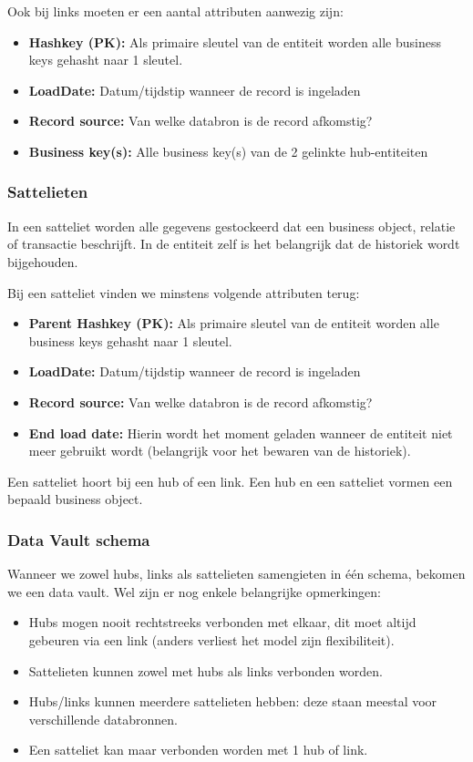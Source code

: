 Ook bij links moeten er een aantal attributen aanwezig zijn:

\begin{itemize}
	\item \textbf{Hashkey (PK):} Als primaire sleutel van de entiteit worden alle business keys gehasht naar 1 sleutel.
	\item \textbf{LoadDate:} Datum/tijdstip wanneer de record is ingeladen
	\item \textbf{Record source:} Van welke databron is de record afkomstig?
	\item \textbf{Business key(s):} Alle business key(s) van de 2 gelinkte hub-entiteiten
\end{itemize} 

\subsubsection{Sattelieten}
In een satteliet worden alle gegevens gestockeerd dat een business object, relatie of transactie beschrijft. In de entiteit zelf is het belangrijk dat de historiek wordt bijgehouden. \autocite{Linstedt2016}

Bij een satteliet vinden we minstens volgende attributen terug:

\begin{itemize}
	\item \textbf{Parent Hashkey (PK):} Als primaire sleutel van de entiteit worden alle business keys gehasht naar 1 sleutel.
	\item \textbf{LoadDate:} Datum/tijdstip wanneer de record is ingeladen
	\item \textbf{Record source:} Van welke databron is de record afkomstig?
	\item \textbf{End load date:} Hierin wordt het moment geladen wanneer de entiteit niet meer gebruikt wordt (belangrijk voor het bewaren van de historiek).
\end{itemize} 

Een satteliet hoort bij een hub of een link. Een hub en een satteliet vormen een bepaald business object. 

\subsubsection{Data Vault schema}
Wanneer we zowel hubs, links als sattelieten samengieten in één schema, bekomen we een data vault. Wel zijn er nog enkele belangrijke opmerkingen:

\begin{itemize}
	\item Hubs mogen nooit rechtstreeks verbonden met elkaar, dit moet altijd gebeuren via een link (anders verliest het model zijn flexibiliteit).
	\item Sattelieten kunnen zowel met hubs als links verbonden worden.
	\item Hubs/links kunnen meerdere sattelieten hebben: deze staan meestal voor verschillende databronnen.
	\item Een satteliet kan maar verbonden worden met 1 hub of link. 
\end{itemize} 

